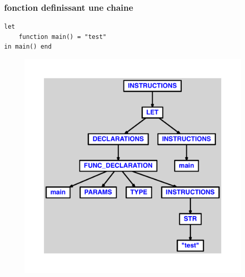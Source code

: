 \documentclass{article}
\begin{document}
\subsubsection{fonction definissant une chaine}
\begin{lstlisting}
let
	function main() = "test"
in main() end
\end{lstlisting}
\newpage
\begin{figure}[H]
\centering
\includegraphics[max width=\textwidth]{ast/ast_237.pdf}
\end{figure}
\newpage
\end{document}
